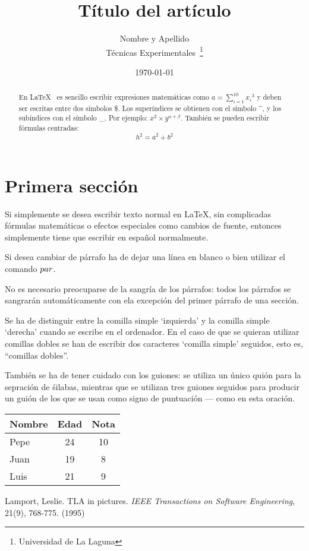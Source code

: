 \documentclass[a4paper,12pt]{article}
\begin{document}
\title{Título del artículo}
\author{Nombre y Apellido \\
	Técnicas Experimentales~\footnote{Universidad de La Laguna}
	}
\date{\today}
\maketitle
\begin{abstract}
  En \LaTeX{}~\cite{Lam:86} es sencillo escribir expresiones
  matemáticas como $a=\sum_{i=1}^{10} {x_i}^{3}$
  y deben ser escritas entre dos símbolos \$.
  Los superíndices se obtienen con el símbolo \^{}, y
  los subíndices con el símbolo \_.
  Por ejemplo: $x^2\times y ^{\alpha + \beta}$.
  También se pueden escribir fórmulas centradas:
  \[h^2=a^2 + b^2 \]
\end{abstract}

\section{Primera sección}
 Si simplemente se desea escribir texto normal en LaTeX,
 sin complicadas f\'ormulas matem\'aticas o efectos especiales
 como cambios de fuente, entonces simplemente tiene que escribir
 en espa\~nol normalmente.\par
 Si desea cambiar de párrafo ha de dejar una línea en blanco o bien
utilizar el comando $\\par$.

 No es necesario preocuparse de la sangría de los párrafos:
 todos los párrafos se sangrarán automáticamente con ela excepción
 del primer párrafo de una sección.
 
 Se ha de distinguir entre la comilla simple `izquierda'
 y la comilla simple `derecha' cuando se escribe en el ordenador.
 En el caso de que se quieran utilizar comillas dobles se han de
 escribir dos caracteres `comilla simple' seguidos, esto es,
 ``comillas dobles''.
 
 También se ha de tener cuidado con los guiones: se utiliza un único
 quión para la sepración de śilabas, mientras que se utilizan
 tres guiones seguidos para producir un guión de los que se usan
 como signo de puntuación --- como en esta oración.
 
 \bigskip 
 \begin{tabular}{|l|c|c|}
  \hline
    Nombre & Edad & Nota \\ \hline
    Pepe   &   24 &   10 \\ \hline
    Juan   &   19 &    8 \\ \hline
    Luis   &   21 &    9 \\ \hline
 \end{tabular}
 \begin{thebibliography}{00}
    Lamport, Leslie.
    TLA in pictures.
    \emph{IEEE Transactions on Software Engineering},
    21(9), 768-775.
    (1995)
  
 \end{thebibliography}
 
 
\end{document}
